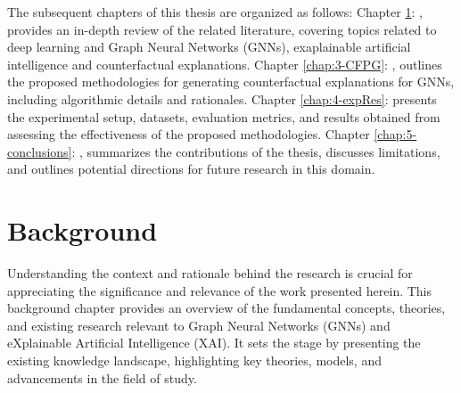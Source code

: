 \documentclass[binding=0.6cm]{sapthesis}
\begin{document}
\bigskip
The subsequent chapters of this thesis are organized as follows:
Chapter \ref{chap:2-background}: , provides an in-depth review of the related literature, covering topics related to deep learning and Graph Neural Networks (GNNs), exaplainable artificial intelligence and counterfactual explanations.
Chapter \ref{chap:3-CFPG}: , outlines the proposed methodologies for generating counterfactual explanations for GNNs, including algorithmic details and rationales.
Chapter \ref{chap:4-expRes}:  presents the experimental setup, datasets, evaluation metrics, and results obtained from assessing the effectiveness of the proposed methodologies.
Chapter \ref{chap:5-conclusions}: , summarizes the contributions of the thesis, discusses limitations, and outlines potential directions for future research in this domain.





\chapter{Background}
\label{chap:2-background}
Understanding the context and rationale behind the research is crucial for appreciating the significance and relevance of the work presented herein. This background chapter provides an overview of the fundamental concepts, theories, and existing research relevant to Graph Neural Networks (GNNs) and eXplainable Artificial Intelligence (XAI). It sets the stage by presenting the existing knowledge landscape, highlighting key theories, models, and advancements in the field of study.
\end{document}
